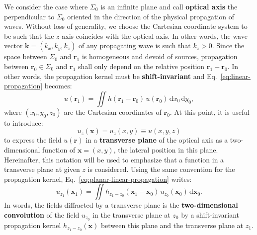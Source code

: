 \documentclass[a4paper]{article}
\newcommand{\V}[1]{\boldsymbol{#1}}
\newcommand*{\mathd}{\mathrm{d}}
\begin{document}
We consider the case where $\Sigma_{0}$ is an infinite plane and call
\textbf{optical axis} the perpendicular to $\Sigma_{0}$ oriented in the
direction of the physical propagation of waves. Without loss of generality, we
choose the Cartesian coordinate system to be such that the $z$-axis coincides
with the optical axis. In other words, the wave vector
$\V{k} = (k_{x},k_{y},k_{z})$ of any propagating wave is such that $k_{z} > 0$.
Since the space between $\Sigma_{0}$ and $\V{r}_{1}$ is homogeneous and devoid
of sources, propagation between $\V{r}_{0} ∈ \Sigma_{0}$ and $\V{r}_{1}$ shall
only depend on the relative position $\V{r}_{1} - \V{r}_{0}$. In other words,
the propagation kernel must be \textbf{shift-invariant} and
Eq.~\eqref{eq:linear-propagation} becomes:
\begin{equation}
  \label{eq:planar-linear-propagation}
  u(\V{r}_{1}) = \iint h(\V{r}_{1} - \V{r}_{0})\,u(\V{r}_{0})\,\mathd x_{0}\,\mathd y_{0},
\end{equation}
where $(x_{0},y_{0},z_{0})$ are the Cartesian coordinates of $\V{r}_{0}$. At
this point, it is useful to introduce:
\begin{equation}
  \label{eq:u_z}
  u_{z}(\V{x}) = u_{z}(x,y) ≡ u(x,y,z)
\end{equation}
to express the field $u(\V{r})$ in a \textbf{transverse plane} of the optical axis
as a two-dimensional function of $\V{x} = (x,y)$, the lateral position in this
plane. Hereinafter, this notation will be used to emphasize that a function in
a transverse plane at given $z$ is considered. Using the same convention for
the propagation kernel, Eq.~\eqref{eq:planar-linear-propagation} writes:
\begin{equation}
  \label{eq:convolutive-propagation}
  u_{z_{1}}(\V{x}_{1}) =
  \iint h_{z_{1} - z_{0}}(\V{x}_{1} - \V{x}_{0})\,
  u_{z_{0}}(\V{x}_{0})\,\mathd\V{x}_{0}.
\end{equation}
In words, the fields diffracted by a transverse plane is the
\textbf{two-dimensional convolution} of the field $u_{z_{0}}$ in the transverse
plane at $z_{0}$ by a shift-invariant propagation kernel
$h_{z_{1} - z_{0}}(\V{x})$ between this plane and the transverse plane at
$z_{1}$.
\end{document}
